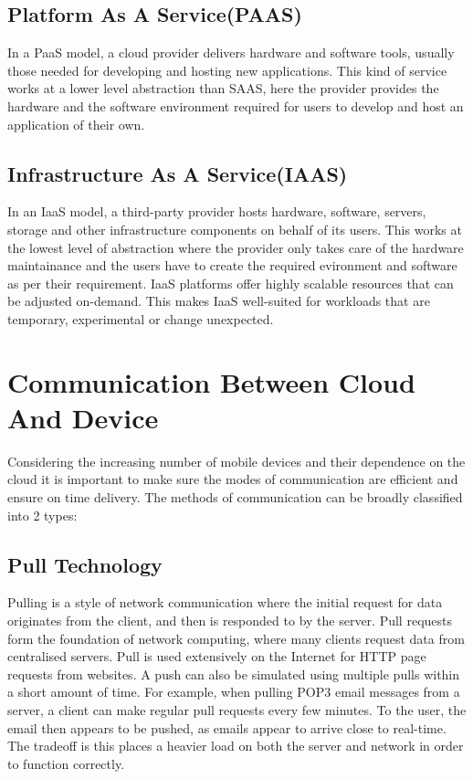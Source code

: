 \subsection{Platform As A Service(PAAS)}
In a PaaS model, a cloud provider delivers hardware and software tools, usually those needed for developing and hosting new applications. This kind of service works at a lower level abstraction than SAAS, here the provider provides the hardware and the software environment required for users to develop and host an application of their own.

\subsection{Infrastructure As A Service(IAAS)}
In an IaaS model, a third-party provider hosts hardware, software, servers, storage and other infrastructure components on behalf of its users. This works at the lowest level of abstraction where the provider only takes care of the hardware maintainance and the users have to create the required evironment and software as per their requirement. IaaS platforms offer highly scalable resources that can be adjusted on-demand. This makes IaaS well-suited for workloads that are temporary, experimental or change unexpected.

\section{Communication Between Cloud And Device}
Considering the increasing number of mobile devices and their dependence on the cloud it is important to make sure the modes of communication are efficient and ensure on time delivery. The methods of communication can be broadly classified into 2 types:
\subsection{Pull Technology}
Pulling is a style of network communication where the initial request for data originates from the client, and then is responded to by the server. Pull requests form the foundation of network computing, where many clients request data from centralised servers. Pull is used extensively on the Internet for HTTP page requests from websites. A push can also be simulated using multiple pulls within a short amount of time. For example, when pulling POP3 email messages from a server, a client can make regular pull requests every few minutes. To the user, the email then appears to be pushed, as emails appear to arrive close to real-time. The tradeoff is this places a heavier load on both the server and network in order to function correctly. 
